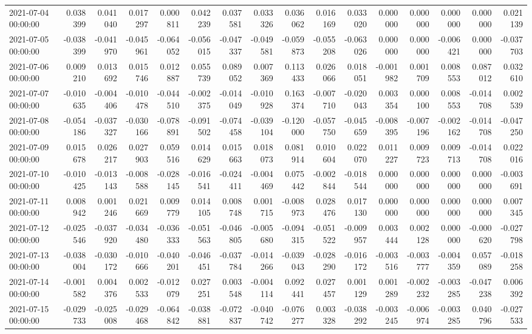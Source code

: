 \begin{tabular}{lrrrrrrrrrrrrrrr}
2021-07-04 00:00:00 & 0.038399 & 0.041040 & 0.017297 & 0.000811 & 0.042239 & 0.037581 & 0.033326 & 0.036062 & 0.016169 & 0.033020 & 0.000000 & 0.000000 & 0.000000 & 0.000000 & 0.021139 \\
2021-07-05 00:00:00 & -0.038399 & -0.041970 & -0.045961 & -0.064052 & -0.056015 & -0.047337 & -0.049581 & -0.059873 & -0.055208 & -0.063026 & 0.000000 & 0.000000 & -0.006421 & 0.000000 & -0.037703 \\
2021-07-06 00:00:00 & 0.009210 & 0.013692 & 0.015746 & 0.012887 & 0.055739 & 0.089052 & 0.007369 & 0.113433 & 0.026066 & 0.018051 & -0.001982 & 0.001709 & 0.008553 & 0.087012 & 0.032610 \\
2021-07-07 00:00:00 & -0.010635 & -0.004406 & -0.010478 & -0.044510 & -0.002375 & -0.014049 & -0.010928 & 0.163374 & -0.007710 & -0.020043 & 0.003354 & 0.000100 & 0.008553 & -0.014708 & 0.002539 \\
2021-07-08 00:00:00 & -0.054186 & -0.037327 & -0.030166 & -0.078891 & -0.091502 & -0.074458 & -0.039104 & -0.120000 & -0.057750 & -0.045659 & -0.008395 & -0.007196 & -0.002162 & -0.014708 & -0.047250 \\
2021-07-09 00:00:00 & 0.015678 & 0.026217 & 0.027903 & 0.059516 & 0.014629 & 0.015663 & 0.018073 & 0.081914 & 0.010604 & 0.022070 & 0.011227 & 0.009723 & 0.009713 & -0.014708 & 0.022016 \\
2021-07-10 00:00:00 & -0.010425 & -0.013143 & -0.008588 & -0.028145 & -0.016541 & -0.024411 & -0.004469 & 0.075442 & -0.002844 & -0.018544 & 0.000000 & 0.000000 & 0.000000 & 0.000000 & -0.003691 \\
2021-07-11 00:00:00 & 0.008942 & 0.001246 & 0.021669 & 0.009779 & 0.014105 & 0.008748 & 0.001715 & -0.008973 & 0.028476 & 0.017130 & 0.000000 & 0.000000 & 0.000000 & 0.000000 & 0.007345 \\
2021-07-12 00:00:00 & -0.025546 & -0.037920 & -0.034480 & -0.036333 & -0.051563 & -0.046805 & -0.005680 & -0.094315 & -0.051522 & -0.009957 & 0.003444 & 0.002128 & 0.000000 & -0.000620 & -0.027798 \\
2021-07-13 00:00:00 & -0.038004 & -0.030172 & -0.010666 & -0.040201 & -0.046451 & -0.037784 & -0.014266 & -0.039043 & -0.028290 & -0.016172 & -0.003516 & -0.003777 & -0.004359 & 0.057089 & -0.018258 \\
2021-07-14 00:00:00 & -0.001582 & 0.004376 & 0.002533 & -0.012079 & 0.027251 & 0.003548 & -0.004114 & 0.092441 & 0.027457 & 0.001129 & 0.001289 & -0.002232 & -0.003285 & -0.047238 & 0.006392 \\
2021-07-15 00:00:00 & -0.029733 & -0.025008 & -0.029468 & -0.064842 & -0.038881 & -0.072837 & -0.040742 & -0.076277 & 0.003328 & -0.038292 & -0.003245 & -0.006974 & -0.003285 & 0.040796 & -0.027533 \\

\end{tabular}
